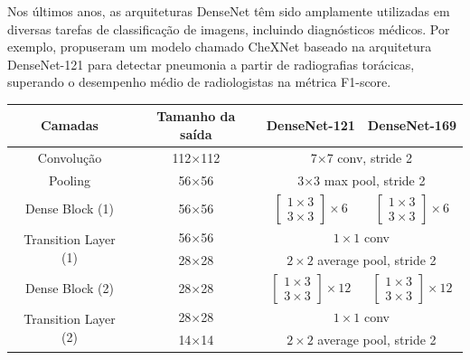 Nos últimos anos, as arquiteturas DenseNet têm sido amplamente utilizadas em diversas tarefas de classificação de imagens, incluindo diagnósticos médicos. Por exemplo, \citep{Rajpurkar2017} propuseram um modelo chamado CheXNet baseado na arquitetura DenseNet-121 para detectar pneumonia a partir de radiografias torácicas, superando o desempenho médio de radiologistas na métrica F1-score.

\begin{table}[h]
    \centering
    \footnotesize
    \begin{tabular}{|c|c|c|c|}
        \hline
        \textbf{Camadas} & \textbf{Tamanho da saída} & \textbf{DenseNet-121} & \textbf{DenseNet-169} \\
        \hline
        Convolução & 112×112 & \multicolumn{2}{c|}{7×7 conv, stride 2} \\
        \hline
        Pooling & 56×56 & \multicolumn{2}{c|}{3×3 max pool, stride 2} \\
        \hline
        Dense Block (1) & 56×56 & 
        $\left[\begin{array}{c}
        1 \times 3 \\
        3 \times 3
        \end{array}\right] \times 6$ & 
        $\left[\begin{array}{c}
        1 \times 3 \\
        3 \times 3
        \end{array}\right] \times 6$ \\
        \hline
        \multirow{2}{*}{Transition Layer (1)} & 56×56 & \multicolumn{2}{c|}{$1 \times 1$ conv} \\
        \cline{2-4}
        & 28×28 & \multicolumn{2}{c|}{$2 \times 2$ average pool, stride 2} \\
        \hline
        Dense Block (2) & 28×28 & 
        $\left[\begin{array}{c}
        1 \times 3 \\
        3 \times 3
        \end{array}\right] \times 12$ & 
        $\left[\begin{array}{c}
        1 \times 3 \\
        3 \times 3
        \end{array}\right] \times 12$ \\
        \hline
        \multirow{2}{*}{Transition Layer (2)} & 28×28 & \multicolumn{2}{c|}{$1 \times 1$ conv} \\
        \cline{2-4}
        & 14×14 & \multicolumn{2}{c|}{$2 \times 2$ average pool, stride 2} \\

\end{tabular}
\end{table}
